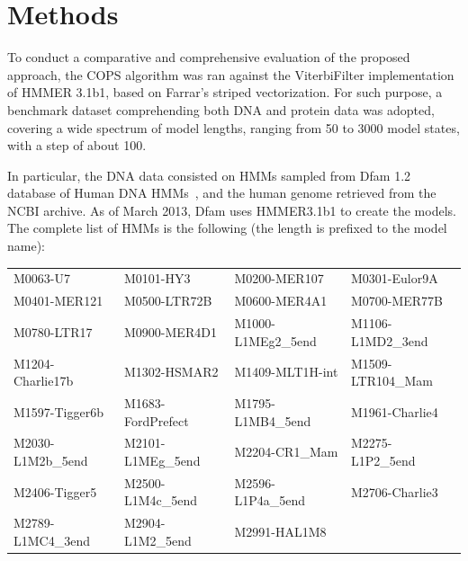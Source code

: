 \documentclass{bmcart}
\begin{document}



\section*{Methods}

To conduct a comparative and comprehensive evaluation of the proposed
approach, the \ac{COPS} algorithm was ran against the ViterbiFilter
implementation of HMMER 3.1b1, based on Farrar's striped
vectorization. For such purpose, a benchmark dataset comprehending
both DNA and protein data was adopted, covering a wide spectrum of
model lengths, ranging from 50 to 3000 model states, with a step of
about 100. 

In particular, the DNA data consisted on \acp{HMM} sampled
from Dfam 1.2 database of Human DNA \acp{HMM}~\cite{dfam}, and the
human genome retrieved from the NCBI archive.  
As of March 2013, Dfam uses HMMER3.1b1 to create the models. The
complete list of HMMs is the following (the length is
prefixed to the model name): 

\vspace{5px}
\begin{tabular}{llll}
M0063-U7			& M0101-HY3			& M0200-MER107		& M0301-Eulor9A		\\
M0401-MER121		& M0500-LTR72B		& M0600-MER4A1		& M0700-MER77B		\\
M0780-LTR17		& M0900-MER4D1		& M1000-L1MEg2\_5end	& M1106-L1MD2\_3end	\\
M1204-Charlie17b	& M1302-HSMAR2		& M1409-MLT1H-int		& M1509-LTR104\_Mam	\\
M1597-Tigger6b	& M1683-FordPrefect	& M1795-L1MB4\_5end	& M1961-Charlie4		\\
M2030-L1M2b\_5end	& M2101-L1MEg\_5end	& M2204-CR1\_Mam		& M2275-L1P2\_5end		\\
M2406-Tigger5		& M2500-L1M4c\_5end	& M2596-L1P4a\_5end	& M2706-Charlie3		\\
M2789-L1MC4\_3end	& M2904-L1M2\_5end		& M2991-HAL1M8							
\end{tabular}
\vspace{1px}
\end{document}
